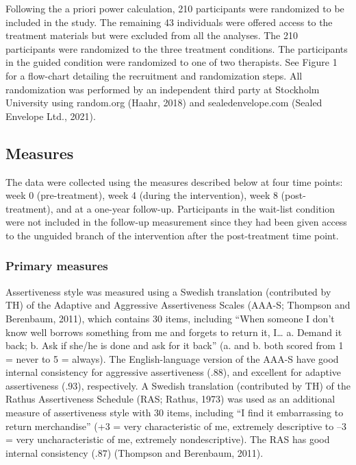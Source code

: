 \documentclass[preprint,
3p]{elsarticle} %
\begin{document}
Following the a priori power calculation, 210 participants were
randomized to be included in the study. The remaining 43 individuals
were offered access to the treatment materials but were excluded from
all the analyses. The 210 participants were randomized to the three
treatment conditions. The participants in the guided condition were
randomized to one of two therapists. See Figure 1 for a flow-chart
detailing the recruitment and randomization steps. All randomization was
performed by an independent third party at Stockholm University using
random.org (Haahr, 2018) and sealedenvelope.com (Sealed Envelope Ltd.,
2021).

\hypertarget{measures}{%
\subsection{Measures}\label{measures}}

The data were collected using the measures described below at four time
points: week 0 (pre-treatment), week 4 (during the intervention), week 8
(post-treatment), and at a one-year follow-up. Participants in the
wait-list condition were not included in the follow-up measurement since
they had been given access to the unguided branch of the intervention
after the post-treatment time point.

\hypertarget{primary-measures}{%
\subsubsection{Primary measures}\label{primary-measures}}

Assertiveness style was measured using a Swedish translation
(contributed by TH) of the Adaptive and Aggressive Assertiveness Scales
(AAA-S; Thompson and Berenbaum, 2011), which contains 30 items,
including ``When someone I don't know well borrows something from me and
forgets to return it, I\ldots{} a. Demand it back; b. Ask if she/he is
done and ask for it back'' (a. and b. both scored from 1 = never to 5 =
always). The English-language version of the AAA-S have good internal
consistency for aggressive assertiveness (\(.88\)), and excellent for
adaptive assertiveness (\(.93\)), respectively. A Swedish translation
(contributed by TH) of the Rathus Assertiveness Schedule (RAS; Rathus,
1973) was used as an additional measure of assertiveness style with 30
items, including ``I find it embarrassing to return merchandise'' (+3 =
very characteristic of me, extremely descriptive to --3 = very
uncharacteristic of me, extremely nondescriptive). The RAS has good
internal consistency (\(.87\)) (Thompson and Berenbaum, 2011).
\end{document}
